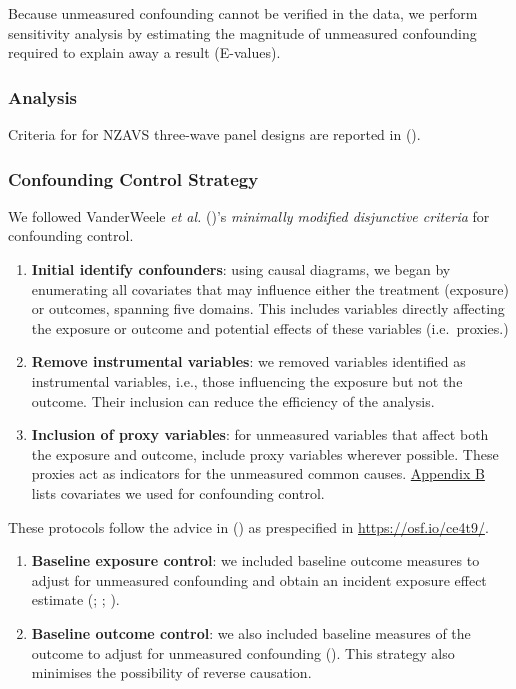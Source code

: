\documentclass[
  singlecolumn]{article}
\begin{document}
Because unmeasured confounding cannot be verified in the data, we
perform sensitivity analysis by estimating the magnitude of unmeasured
confounding required to explain away a result (E-values).

\subsubsection{Analysis}\label{analysis}

Criteria for for NZAVS three-wave panel designs are reported in
().

\subsubsection{Confounding Control
Strategy}\label{confounding-control-strategy}

We followed VanderWeele \emph{et al.}
()'s \emph{minimally modified
disjunctive criteria} for confounding control.

\begin{enumerate}
\def\labelenumi{\arabic{enumi}.}
\item
  \textbf{Initial identify confounders}: using causal diagrams, we began
  by enumerating all covariates that may influence either the treatment
  (exposure) or outcomes, spanning five domains. This includes variables
  directly affecting the exposure or outcome and potential effects of
  these variables (i.e.~proxies.)
\item
  \textbf{Remove instrumental variables}: we removed variables
  identified as instrumental variables, i.e., those influencing the
  exposure but not the outcome. Their inclusion can reduce the
  efficiency of the analysis.
\item
  \textbf{Inclusion of proxy variables}: for unmeasured variables that
  affect both the exposure and outcome, include proxy variables wherever
  possible. These proxies act as indicators for the unmeasured common
  causes. \hyperref[appendix-demographics]{Appendix B} lists covariates
  we used for confounding control.
\end{enumerate}

These protocols follow the advice in
() as prespecified in
\url{https://osf.io/ce4t9/}.

\begin{enumerate}
\def\labelenumi{\arabic{enumi}.}
\setcounter{enumi}{3}
\item
  \textbf{Baseline exposure control}: we included baseline outcome
  measures to adjust for unmeasured confounding and obtain an incident
  exposure effect estimate (; ;
  ).
\item
  \textbf{Baseline outcome control}: we also included baseline measures
  of the outcome to adjust for unmeasured confounding
  (). This
  strategy also minimises the possibility of reverse causation.
\end{enumerate}
\end{document}
